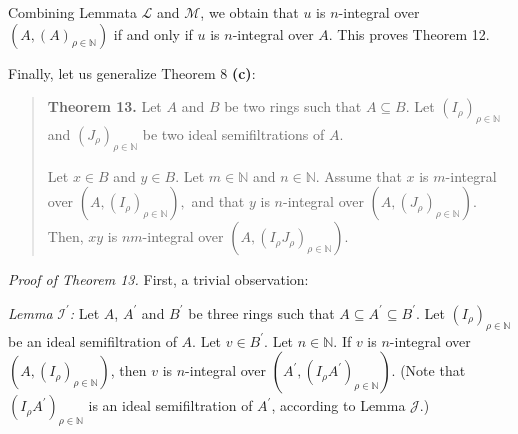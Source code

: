 \documentclass[12pt,final,notitlepage,onecolumn]{article}%
\begin{document}
Combining Lemmata $\mathcal{L}$ and $\mathcal{M}$, we obtain that $u$ is
$n$-integral over $\left(  A,\left(  A\right)  _{\rho\in\mathbb{N}}\right)  $
if and only if $u$ is $n$-integral over $A$. This proves Theorem 12.

Finally, let us generalize Theorem 8 \textbf{(c)}:

\begin{quote}
\textbf{Theorem 13.} Let $A$ and $B$ be two rings such that $A\subseteq B$.
Let $\left(  I_{\rho}\right)  _{\rho\in\mathbb{N}}$ and $\left(  J_{\rho
}\right)  _{\rho\in\mathbb{N}}$ be two ideal semifiltrations of $A$.

Let $x\in B$ and $y\in B$. Let $m\in\mathbb{N}$ and $n\in\mathbb{N}$. Assume
that $x$ is $m$-integral over $\left(  A,\left(  I_{\rho}\right)  _{\rho
\in\mathbb{N}}\right)  ,$ and that $y$ is $n$-integral over $\left(  A,\left(
J_{\rho}\right)  _{\rho\in\mathbb{N}}\right)  $. Then, $xy$ is $nm$-integral
over $\left(  A,\left(  I_{\rho}J_{\rho}\right)  _{\rho\in\mathbb{N}}\right)
$.
\end{quote}

\textit{Proof of Theorem 13.} First, a trivial observation:

\textit{Lemma }$\mathcal{I}^{\prime}$\textit{:} Let $A$, $A^{\prime}$ and
$B^{\prime}$ be three rings such that $A\subseteq A^{\prime}\subseteq
B^{\prime}$. Let $\left(  I_{\rho}\right)  _{\rho\in\mathbb{N}}$ be an ideal
semifiltration of $A$. Let $v\in B^{\prime}$. Let $n\in\mathbb{N}$. If $v$ is
$n$-integral over $\left(  A,\left(  I_{\rho}\right)  _{\rho\in\mathbb{N}%
}\right)  $, then $v$ is $n$-integral over $\left(  A^{\prime},\left(
I_{\rho}A^{\prime}\right)  _{\rho\in\mathbb{N}}\right)  $. (Note that $\left(
I_{\rho}A^{\prime}\right)  _{\rho\in\mathbb{N}}$ is an ideal semifiltration of
$A^{\prime}$, according to Lemma $\mathcal{J}$.)
\end{document}
